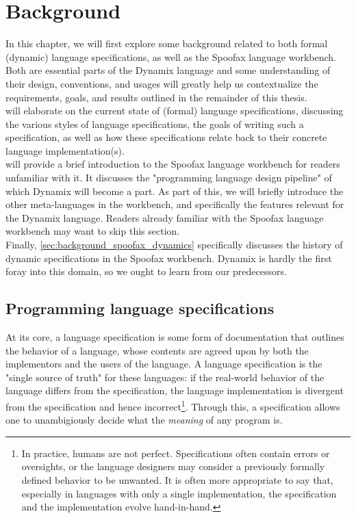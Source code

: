 
\chapter{\label{ch:spoofax}Background}

In this chapter, we will first explore some background related to both formal (dynamic) language specifications, as well as the Spoofax language workbench. Both are essential parts of the Dynamix language and some understanding of their design, conventions, and usages will greatly help us contextualize the requirements, goals, and results outlined in the remainder of this thesis.\\

 will elaborate on the current state of (formal) language specifications, discussing the various styles of language specifications, the goals of writing such a specification, as well as how these specifications relate back to their concrete language implementation(s).\\

 will provide a brief introduction to the Spoofax language workbench for readers unfamiliar with it. It discusses the "programming language design pipeline" of which Dynamix will become a part. As part of this, we will briefly introduce the other meta-languages in the workbench, and specifically the features relevant for the Dynamix language. Readers already familiar with the Spoofax language workbench may want to skip this section.\\

Finally, \cref{sec:background_spoofax_dynamics} specifically discusses the history of dynamic specifications in the Spoofax workbench. Dynamix is hardly the first foray into this domain, so we ought to learn from our predecessors.

\section{Programming language specifications}
\label{sec:background_language_specifications}

At its core, a language specification is some form of documentation that outlines the behavior of a language, whose contents are agreed upon by both the implementors and the users of the language. A language specification is the "single source of truth" for these languages: if the real-world behavior of the language differs from the specification, the language implementation is divergent from the specification and hence incorrect\footnote{In practice, humans are not perfect. Specifications often contain errors or oversights, or the language designers may consider a previously formally defined behavior to be unwanted. It is often more appropriate to say that, especially in languages with only a single implementation, the specification and the implementation evolve hand-in-hand.}. Through this, a specification allows one to unambigiously decide what the \textit{meaning} of any program is.\\

